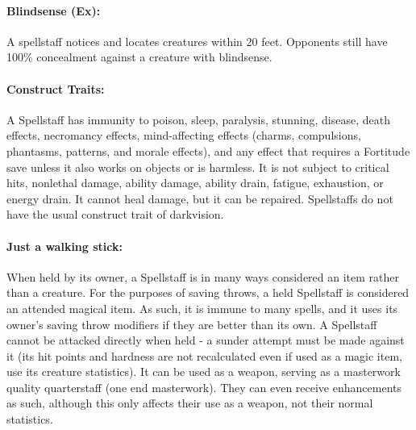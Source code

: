 \paragraph{Blindsense (Ex):} A spellstaff notices and locates creatures within 20 feet. Opponents still have 100\% concealment against a creature with blindsense. 
 
\paragraph{Construct Traits:} A Spellstaff has immunity to poison, sleep, paralysis, stunning, disease, death effects, 
necromancy effects, mind-affecting effects (charms, compulsions, phantasms, patterns, and morale effects), 
and any effect that requires a Fortitude save unless it also works on objects or is harmless. 
It is not subject to critical hits, nonlethal damage, ability damage, ability drain, fatigue, exhaustion, or energy drain. 
It cannot heal damage, but it can be repaired. 
Spellstaffs do not have the usual construct trait of darkvision.

\paragraph{Just a walking stick:} When held by its owner, a Spellstaff is in many ways considered an item rather than a creature.
For the purposes of saving throws, a held Spellstaff is considered an attended magical item.
As such, it is immune to many spells, and it uses its owner's saving throw modifiers if they are better than its own.
A Spellstaff cannot be attacked directly when held - a sunder attempt must be made against it
(its hit points and hardness are not recalculated even if used as a magic item, use its creature statistics).
It can be used as a weapon, serving as a masterwork quality quarterstaff (one end masterwork).
They can even receive enhancements as such, although this only affects their use as a weapon, not their normal statistics.
 
